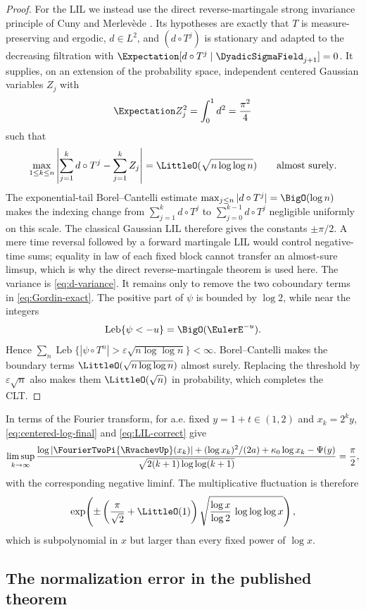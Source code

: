 \documentclass[11pt,oneside]{article}
\numberwithin{equation}{section}
\theoremstyle{definition}
\theoremstyle{remark}
\newcommand{\LebesgueMeasure}{\operatorname{Leb}}
\begin{document}
\begin{proof}
For the LIL we instead use the direct reverse-martingale strong invariance principle of
Cuny and Merlev\`ede \cite[Cor.~2.5 and Rem.~2.6]{cuny-merlevede2015}.  Its hypotheses are
exactly that $T$ is measure-preserving and ergodic, $d\in L^2$, and
$(d\circ T^j)$ is stationary and adapted to the decreasing filtration with
$\Expectation[d\circ T^j\mid\DyadicSigmaField_{j+1}]=0$.  It supplies, on an extension of the
probability space, independent centered Gaussian variables $Z_j$ with
\[
 \Expectation Z_j^2=\int_0^1d^2=\frac{\pi^2}{4}
\]
such that
\[
 \max_{1\le k\le n}
 \left|\sum_{j=1}^k d\circ T^j-\sum_{j=1}^kZ_j\right|
 =\LittleO(\sqrt{n\log\log n})
 \qquad\text{almost surely}.
\]
The exponential-tail Borel--Cantelli estimate
$\max_{j\le n}|d\circ T^j|=\BigO(\log n)$ makes the indexing change from
$\sum_{j=1}^k d\circ T^j$ to $\sum_{j=0}^{k-1}d\circ T^j$ negligible uniformly on this
scale.  The classical Gaussian LIL therefore gives the constants $\pm\pi/2$.  A mere
time reversal followed by a forward martingale LIL would control negative-time sums;
equality in law of each fixed block cannot transfer an almost-sure limsup, which is why the
direct reverse-martingale theorem is used here.  The variance is \eqref{eq:d-variance}.
It remains only to remove
the two coboundary terms in \eqref{eq:Gordin-exact}.  The positive part of $\psi$ is bounded
by $\log2$, while near the integers
\[
 \LebesgueMeasure\{\psi<-u\}=\BigO(\EulerE^{-u}).
\]
Hence
$\sum_n\LebesgueMeasure\{|\psi\circ T^n|>\varepsilon\sqrt{n\log\log n}\}<\infty$.
Borel--Cantelli makes the boundary terms $\LittleO(\sqrt{n\log\log n})$ almost surely.  Replacing
the threshold by $\varepsilon\sqrt n$ also makes them $\LittleO(\sqrt n)$ in probability, which
completes the CLT.
\end{proof}

In terms of the Fourier transform, for a.e. fixed $y=1+t\in(1,2)$ and
$x_k=2^ky$, \eqref{eq:centered-log-final} and \eqref{eq:LIL-correct} give
\begin{equation}
 \limsup_{k\to\infty}
 \frac{\log|\FourierTwoPi{\RvachevUp}(x_k)|+(\log x_k)^2/(2a)+\kappa_0\log x_k-\Psi(y)}
 {\sqrt{2(k+1)\log\log(k+1)}}=\frac\pi2,
 \label{eq:LIL-Phi}
\end{equation}
with the corresponding negative liminf.  The multiplicative fluctuation is therefore
\[
 \exp\!\left(\pm\left(\frac\pi{\sqrt2}+\LittleO(1)\right)
 \sqrt{\frac{\log x}{\log2}\,\log\log\log x}\right),
\]
which is subpolynomial in $x$ but larger than every fixed power of $\log x$.

\subsection{The normalization error in the published theorem}
\label{subsec:published-error}
\end{document}
